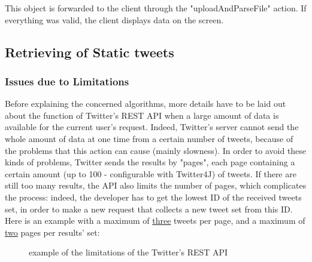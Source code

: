 \documentclass[a4paper,11pt]{report}
\begin{document}
This object is forwarded to the client through the "uploadAndParseFile" action. If everything was valid, the client displays data on the screen.
\newpage

\subsection{Retrieving of Static tweets}
\subsubsection{Issues due to Limitations}
Before explaining the concerned algorithms, more details have to be laid out about the function of Twitter's REST API when a large amount of data is available for the current user's request. Indeed, Twitter's server cannot send the whole amount of data at one time from a certain number of tweets, because of the problems that this action can cause (mainly slowness). In order to avoid these kinds of problems, Twitter sends the results by "pages", each page containing a certain amount (up to 100 - configurable with Twitter4J) of tweets. If there are still too many results, the API also limits the number of pages, which complicates the process: indeed, the developer has to get the lowest ID of the received tweets set, in order to make a new request that collects a new tweet set from this ID. Here is an example with a maximum of \underline{three} tweets per page, and a maximum of \underline{two} pages per results' set:
\begin{figure}[H]
\vspace{-5pt}
\begin{center}
\vspace{-5pt}
\caption{example of the limitations of the Twitter's REST API}
\end{center}
\end{figure}
\end{document}
